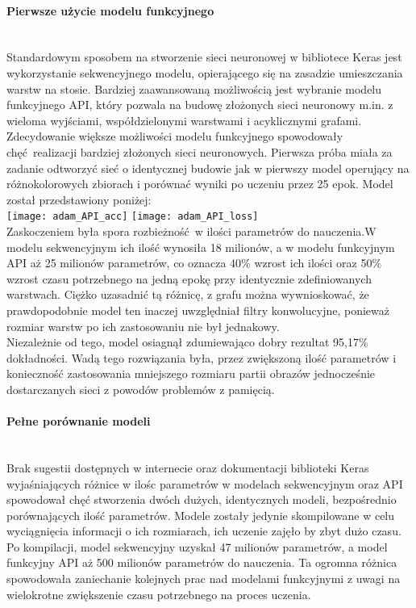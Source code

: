 \paragraph{Pierwsze użycie modelu funkcyjnego} \mbox{}\\
Standardowym sposobem na stworzenie sieci neuronowej w bibliotece Keras jest wykorzystanie
sekwencyjnego modelu, opierającego się na zasadzie umieszczania warstw na stosie. Bardziej
zaawansowaną możliwością jest wybranie modelu funkcyjnego API, który pozwala na budowę złożonych
sieci neuronowy m.in. z wieloma wyjściami, współdzielonymi warstwami i acyklicznymi grafami.\\
Zdecydowanie większe możliwości modelu funkcyjnego spowodowały chęć realizacji bardziej złożonych
sieci neuronowych. Pierwsza próba miała za zadanie odtworzyć sieć o identycznej budowie jak w
pierwszy model operujący na różnokolorowych zbiorach i porównać wyniki po uczeniu przez 25 epok.
Model został przedstawiony poniżej:\\
\texttt{[image: adam\_API\_acc]}
\texttt{[image: adam\_API\_loss]}\\
Zaskoczeniem była spora rozbieżność w ilości parametrów do nauczenia.W modelu sekwencyjnym
ich ilość wynosiła 18 milionów, a w modelu funkcyjnym API aż 25 milionów parametrów, co oznacza
40\% wzrost ich ilości oraz 50\% wzrost czasu potrzebnego na jedną epokę przy identycznie
zdefiniowanych warstwach. Ciężko uzasadnić tą różnicę, z grafu można wywnioskować, że
prawdopodobnie model ten inaczej uwzględniał filtry konwolucyjne, ponieważ rozmiar warstw
po ich zastosowaniu nie był jednakowy.\\
Niezależnie od tego, model osiagnął zdumiewająco dobry rezultat 95,17\% dokładności.
Wadą tego rozwiązania była, przez zwiększoną ilość parametrów i konieczność zastosowania
mniejszego rozmiaru partii obrazów jednocześnie dostarczanych sieci z powodów
problemów z pamięcią.

\paragraph{Pełne porównanie modeli} \mbox{}\\
Brak sugestii dostępnych w internecie oraz dokumentacji biblioteki Keras wyjaśniających różnice
w ilośc parametrów w modelach sekwencyjnym oraz API spowodował chęć stworzenia dwóch dużych,
identycznych modeli, bezpośrednio porównających ilość parametrów. Modele zostały jedynie
skompilowane w celu wyciągnięcia informacji o ich rozmiarach, ich uczenie zajęło by zbyt dużo czasu.\\
Po kompilacji, model sekwencyjny uzyskał 47 milionów parametrów, a model funkcyjny API
aż 500 milionów parametrów do nauczenia. Ta ogromna różnica spowodowała zaniechanie
kolejnych prac nad modelami funkcyjnymi z uwagi na wielokrotne zwiększenie czasu potrzebnego
na proces uczenia.


